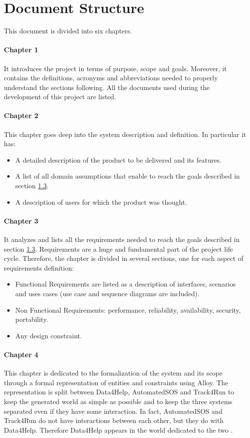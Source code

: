 \documentclass[../rasd.tex]{subfiles}
\begin{document}
		\section{Document Structure}
		This document is divided into six chapters.
		\paragraph{Chapter 1}
		It introduces the project in terms of purpose, scope and goals. Moreover, it contains the definitions, acronyms and abbreviations needed to properly understand the sections following. All the documents used during the development of this project are listed.
		\paragraph{Chapter 2}
		This chapter goes deep into the system description and definition. In particular it has:
		\begin{itemize}
			\item A detailed description of the product to be delivered and its features.
			\item A list of all domain assumptions that enable to reach the goals described in section \hyperref[sect:1.3]{1.3}.
			\item A description of users for which the product was thought.
		\end{itemize}
		\paragraph{Chapter 3}
		It analyzes and lists all the requirements needed to reach the goals described in section \hyperref[sect:1.3]{1.3}. Requirements are a huge and fundamental part of the project life cycle. Therefore, the chapter is divided in several sections, one for each aspect of requirements definition:
		\begin{itemize}
			\item Functional Requirements are listed as a description of interfaces, scenarios and uses cases (use case and sequence diagrams are included).
			\item Non Functional Requirements: performance, reliability, availability, security, portability.
			\item Any design constraint.
		\end{itemize}
		\paragraph{Chapter 4}
		This chapter is dedicated to the formalization of the system and its scope through a formal representation of entities and constraints using Alloy. The representation is split between Data4Help, AutomatedSOS and Track4Run to keep the generated world as simple as possible and to keep the three systems separated even if they have some interaction. In fact, AutomatedSOS and Track4Run do not have interactions between each other, but they do with Data4Help. Therefore Data4Help appears in the world dedicated to the two .
\end{document}
